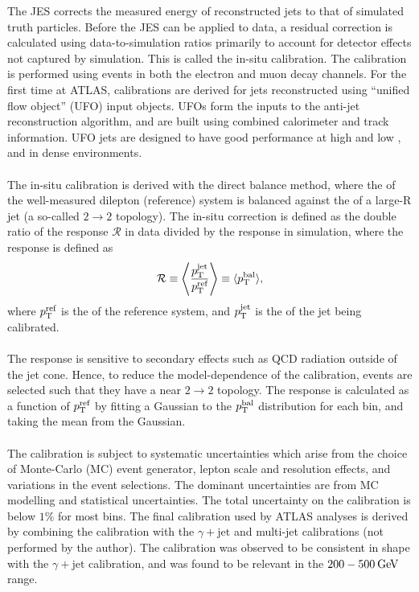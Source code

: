 \documentclass{thesissummary}
\begin{document}
The JES corrects the measured energy of reconstructed jets to that of simulated truth particles. Before the JES can be applied to data, a residual correction is calculated using data-to-simulation ratios primarily to account for detector effects not captured by simulation. This is called the in-situ calibration. The calibration is performed using \zjet events in both the electron and muon decay channels. For the first time at ATLAS, calibrations are derived for jets reconstructed using ``unified flow object'' (UFO) input objects. UFOs form the inputs to the anti-\kt jet reconstruction algorithm, and are built using combined calorimeter and track information. UFO jets are designed to have good performance at high and low \pt, and in dense environments.%
\\\\
The in-situ calibration is derived with the direct balance method, where the \pt of the well-measured dilepton (reference) system is balanced against the \pt of a large-R jet (a so-called $2\rightarrow2$ topology). The in-situ correction is defined as the double ratio of the response $\mathcal{R}$ in data divided by the response in simulation, where the response is defined as 
\begin{equation}
    \mathcal{R} \equiv \Bigg\langle\frac{p_{\text{T}}^{\text{jet}}}{p_{\text{T}}^{\text{ref}}}\Bigg\rangle \equiv \langle p_{\text{T}}^{\text{bal}}\rangle,
\end{equation}
where $p_{\text{T}}^{\text{ref}}$ is the \pt of the reference system, and $p_{\text{T}}^{\text{jet}}$ is the \pt of the jet being calibrated.
\\\\
The response is sensitive to secondary effects such as QCD radiation outside of the jet cone. Hence, to reduce the model-dependence of the calibration, events are selected such that they have a near $2\rightarrow2$ topology. The response is calculated as a function of $p_{\text{T}}^{\text{ref}}$ by fitting a Gaussian to the $p_{\text{T}}^{\text{bal}}$ distribution for each bin, and taking the mean from the Gaussian.%
\\\\
The calibration is subject to systematic uncertainties which arise from the choice of Monte-Carlo (MC) event generator, lepton scale and resolution effects, and variations in the event selections. The dominant uncertainties are from MC modelling and statistical uncertainties. The total uncertainty on the calibration is below $1\%$ for most bins. The final calibration used by ATLAS analyses is derived by combining the \zjet calibration with the $\gamma+\text{jet}$ and multi-jet calibrations (not performed by the author). The \zjet calibration was observed to be consistent in shape with the $\gamma+\text{jet}$ calibration, and was found to be relevant in the $200-500\hspace{2pt}\text{Ge\kern -0.1em V}$ range.
\end{document}

